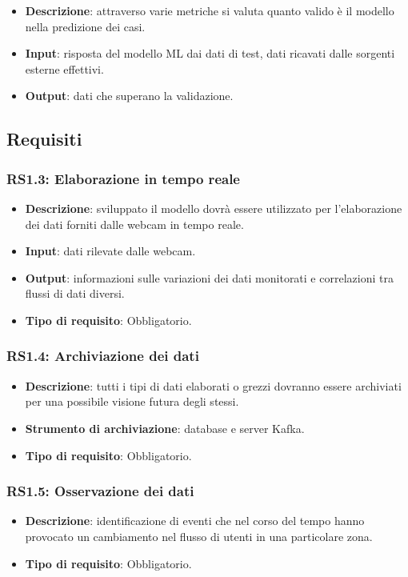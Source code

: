 \begin{itemize}
	\item \textbf{Descrizione}: attraverso varie metriche si valuta quanto valido è il modello nella predizione dei casi.
	\item \textbf{Input}: risposta del modello ML dai dati di test, dati ricavati dalle sorgenti esterne effettivi.
	\item \textbf{Output}: dati che superano la validazione.
\end{itemize}

\subsection{Requisiti}

\subsubsection{RS1.3: Elaborazione in tempo reale}

\begin{itemize}
	\item \textbf{Descrizione}: sviluppato il modello dovrà essere utilizzato per l'elaborazione dei dati forniti dalle webcam in tempo reale.
	\item \textbf{Input}: dati rilevate dalle webcam.
	\item \textbf{Output}: informazioni sulle variazioni dei dati monitorati e correlazioni tra flussi di dati diversi.
	\item \textbf{Tipo di requisito}: Obbligatorio.
\end{itemize}

\subsubsection{RS1.4: Archiviazione dei dati}
\begin{itemize}
	\item \textbf{Descrizione}: tutti i tipi di dati elaborati o grezzi dovranno essere archiviati per una possibile visione futura degli stessi.
	\item \textbf{Strumento di archiviazione}: database e server Kafka.
	\item \textbf{Tipo di requisito}: Obbligatorio.
\end{itemize}

\subsubsection{RS1.5: Osservazione dei dati}
\begin{itemize}
	\item \textbf{Descrizione}: identificazione di eventi che nel corso del tempo hanno provocato un cambiamento nel flusso di utenti in una particolare zona.
	\item \textbf{Tipo di requisito}: Obbligatorio.
\end{itemize}

